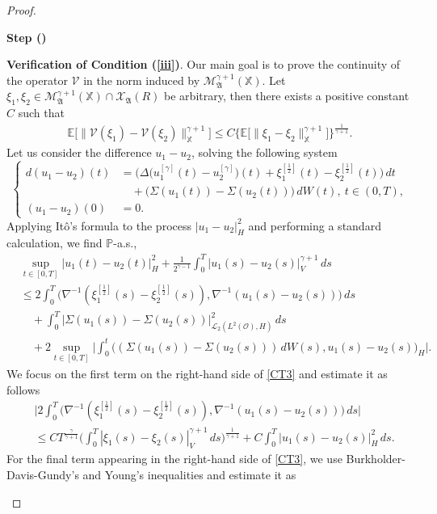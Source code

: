 \documentclass[english,a4paper,11pt]{amsart}
\theoremstyle{plain}
\theoremstyle{definition}
\theoremstyle{remark}
\numberwithin{equation}{section}
\newcounter{lil1}
\newenvironment{step}
{\begin{list} { \bf Step (\Roman{lil1})}
		{ \usecounter{lil1}
			\setlength{\leftmargin}{0.0cm}
			\setlength{\topsep}{0.2cm}
			\setlength{\itemsep}{0.0cm}
			\setlength{\parsep}{0.1cm}
			\setlength{\itemindent}{0.8cm}
			\setlength{\parskip}{0.0cm}}}
	{\end{list}}
\newcounter{lil33}
\newcounter{lil1q}
\newcommand{\CO}{{{ \mathcal O }}}
\newcommand{\EE}{ \mathbb{E} }
\newcommand{\Mcal} {{\mathcal M}}
\newcommand{\Vcal} {{\mathcal V}}
\newcommand{\Xcal} {{\mathcal X}}
\newcommand{\Afrak} {{\mathfrak A}}
\renewcommand{\P}{\mathbb{P}}
\newcommand{\X}{\mathbb{X}}
\begin{document}
\begin{proof}
\begin{step}
\item
\textbf{Verification of Condition (\ref{iii})}. Our main goal is to prove the continuity of the operator $\Vcal$ in the norm induced by $\Mcal_\Afrak^{\gamma+1}(\X)$. Let $\xi_1,\xi_2\in \Mcal_\Afrak^{\gamma+1}(\X)\cap\Xcal_\Afrak(R)$ be arbitrary, then there exists a positive constant $C$ such that 
\begin{align*}
	\EE\big[\|\Vcal(\xi_1)-\Vcal(\xi_2)\|_\X ^{\gamma+1}\big] \leq C\Big\{\EE\big[\|\xi_1-\xi_2\|_\X^{\gamma+1}\big]\Big\}^\frac{1}{\gamma+1}.
\end{align*}
Let us consider the difference $u_1-u_2$, solving the following system 
\begin{equation*}
	\left\{
	\begin{aligned}
		d ( u_1-u_2)(t)&= \big(\Delta \big(u_1^{[\gamma]}(t)-u_2^{[\gamma]}\big)(t)+\xi_1^{[\frac{1}{2}]}(t)-\xi_2^{[\frac{1}{2}]}(t)\big)\, d t\\&\quad +\big(\Sigma (u_1(t))-\Sigma(u_2(t))\big)\, dW(t), \ t\in (0,T),\\
		(u_1-u_2)(0)&=0.
	\end{aligned}
	\right.
\end{equation*}Applying It\^o's formula to the process $|u_1-u_2|_H^2$ and performing a standard calculation, we find $\P$-a.s.,
\begin{align}\label{CT3}\nonumber
&\sup_{t\in[0,T]} | u_1(t)-u_2(t) | _H^2+\frac{1}{2^{\gamma-1}} \int_0^T | u_1(s)-u_2(s) | _V^{\gamma+1}\,ds 
\\&\nonumber
\leq 2\int_0^T \big(\nabla^{-1}(\xi_1^{[\frac{1}{2}]}(s)-\xi_2^{[\frac{1}{2}]}(s)), \nabla^{-1}(u_1(s)-u_2(s))\big)\,ds \\&\nonumber \quad +\int_0^T | \Sigma(u_1(s))-\Sigma(u_2(s)) | _{\mathcal{L}_2(L^2(\CO),H)}^2\,ds \\&\quad +2\sup_{t\in[0,T]}\bigg|\int_0^t\big((\Sigma(u_1(s))-\Sigma(u_2(s)))\, dW(s), u_1(s)-u_2(s)\big)_H \bigg|. 
\end{align}
We focus on the first term on the right-hand side of \eqref{CT3} and estimate it as follows
\begin{align*}
&	\bigg|2\int_0^T \big(\nabla^{-1}(\xi_1^{[\frac{1}{2}]}(s)-\xi_2^{[\frac{1}{2}]}(s)), \nabla^{-1}(u_1(s)-u_2(s))\big)\,ds \bigg|
\\&\leq C T^{\frac{\gamma}{\gamma+1}} \bigg(\int_0^T | \xi_1(s)-\xi_2(s) | _V^{\gamma+1}\,ds \bigg)^\frac{1}{\gamma+1}+C \int_0^T | u_1(s)-u_2(s) | _{H}^2\,ds.
\end{align*}For the final term appearing in the right-hand side of \eqref{CT3}, we use Burkholder-Davis-Gundy's and Young's inequalities and estimate it as 

\end{step}
\end{proof}
\end{document}
